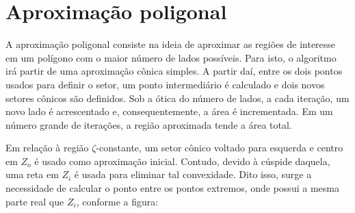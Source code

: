 \section{Aproximação poligonal}
A aproximação poligonal consiste na ideia de aproximar as regiões de interesse em um polígono com o maior número de lados possíveis. Para isto, o algoritmo irá partir de uma aproximação cônica simples. A partir daí, entre os dois pontos usados para definir o setor, um ponto intermediário é calculado e dois novos setores cônicos são definidos.
Sob a ótica do número de lados, a cada iteração, um novo lado é acrescentado e, consequentemente, a área é incrementada. Em um número grande de iterações, a região aproximada tende a área total.

Em relação à região $\zeta$-constante, um setor cônico voltado para esquerda e centro em $Z_o$ é usado como aproximação inicial. Contudo, devido à cúspide daquela, uma reta em $Z_i$ é usada para eliminar tal convexidade. Dito isso, surge a necessidade de calcular o ponto entre os pontos extremos, onde possui a mesma parte real que $Z_i$, conforme a figura:

